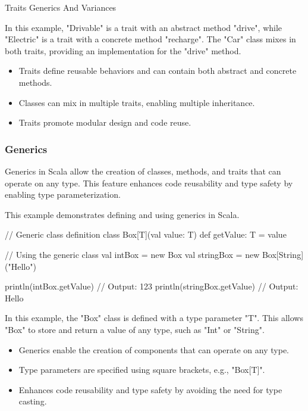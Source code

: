 \begin{notes}{Traits Generics And Variances}
\begin{highlight}[Traits]
        In this example, "Drivable" is a trait with an abstract method "drive", while "Electric" is a trait with a concrete method "recharge". The "Car" class mixes in both traits, providing an implementation for the "drive" method.
    
        \begin{itemize}
            \item Traits define reusable behaviors and can contain both abstract and concrete methods.
            \item Classes can mix in multiple traits, enabling multiple inheritance.
            \item Traits promote modular design and code reuse.
        \end{itemize}
    
    \end{highlight}
    
    \subsubsection*{Generics}
    
    Generics in Scala allow the creation of classes, methods, and traits that can operate on any type. This feature enhances code reusability and type safety by enabling type parameterization.
    
    \begin{highlight}[Generics]
    
        This example demonstrates defining and using generics in Scala.
    
    \begin{code}[Scala]
    // Generic class definition
    class Box[T](val value: T) {
        def getValue: T = value
    }
    
    // Using the generic class
    val intBox = new Box 
    val stringBox = new Box[String]("Hello")
    
    println(intBox.getValue)  // Output: 123
    println(stringBox.getValue)  // Output: Hello
    \end{code}
    
        In this example, the "Box" class is defined with a type parameter "T". This allows "Box" to store and return a value of any type, such as "Int" or "String".
    
        \begin{itemize}
            \item Generics enable the creation of components that can operate on any type.
            \item Type parameters are specified using square brackets, e.g., "Box[T]".
            \item Enhances code reusability and type safety by avoiding the need for type casting.
        \end{itemize}
    

\end{highlight}
\end{notes}
